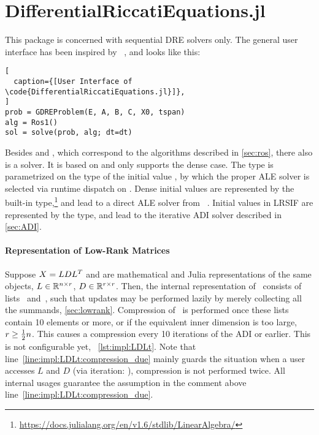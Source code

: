 \section{DifferentialRiccatiEquations.jl}
\label{sec:impl:DRE}

%

This package is concerned with sequential \ac{DRE} solvers only.
The general user interface has been inspired by ~\cite{DifferentialEquations},
and looks like this:
\begin{lstlisting}[
  caption={[User Interface of \code{DifferentialRiccatiEquations.jl}]},
]
prob = GDREProblem(E, A, B, C, X0, tspan)
alg = Ros1()
sol = solve(prob, alg; dt=dt)
\end{lstlisting}
Besides  and ,
which correspond to the algorithms described in \autoref{sec:ros},
there also is a  solver.
It is based on \cite[Appendix~A]{Lang2017} and only supports the dense case.
The  type is parametrized on the type of the initial value ,
by which the proper \ac{ALE} solver is selected via runtime dispatch on .
Dense initial values are represented by the built-in  type,\footnote{%
  \url{https://docs.julialang.org/en/v1.6/stdlib/LinearAlgebra/}}
and lead to a direct \ac{ALE} solver from ~\cite{MatrixEquations}.
Initial values in \ac{LRSIF} are represented by the \julia{\LDLt} type,
and lead to the iterative \ac{ADI} solver described in \autoref{sec:ADI}.

\paragraph{Representation of Low-Rank Matrices}

Suppose $X = LDL^T$ and  are mathematical and Julia representations of the same objects,
$L\in\mathbb{R}^{n\times r}$, $D\in\mathbb{R}^{r\times r}$.
Then, the internal representation of~ consists of lists~\julia{[L]} and~\julia{[D]},
such that updates may be performed lazily by merely collecting all the summands,
\cf \autoref{sec:lowrank}.
Compression of~ is performed once these lists contain 10 elements or more,
or if the equivalent inner dimension is too large, $r \geq \tfrac{1}{2} n$.
This causes a compression every 10 iterations of the \ac{ADI} or earlier.
This is not configurable yet,
\cf~\autoref{lst:impl:LDLt}.
Note that line~\ref{line:impl:LDLt:compression_due} mainly guards the situation
when a user accesses $L$ and $D$ (via iteration: \mbox{}),
compression is not performed twice.
All internal usages guarantee the assumption in the comment above line~\ref{line:impl:LDLt:compression_due}.

